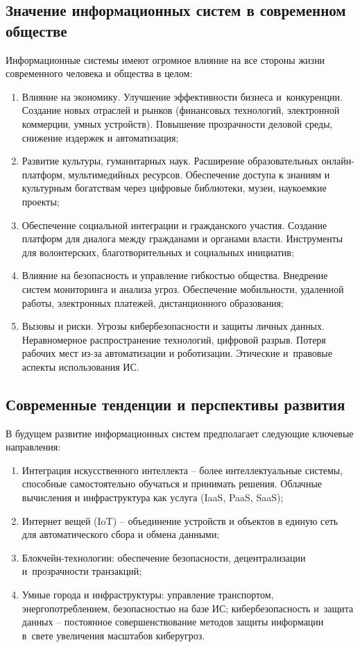 \documentclass{ou}
\begin{document}
\subsection{Значение информационных систем в современном обществе}
Информационные системы имеют огромное влияние на все стороны жизни современного человека и общества в целом:
\begin{enumerate}[leftmargin=0em, itemindent=3.75em, nosep, label=\arabic*)]
\item Влияние на экономику. Улучшение эффективности бизнеса и~конкуренции. Создание новых отраслей и рынков (финансовых технологий, электронной коммерции, умных устройств). Повышение прозрачности деловой среды, снижение издержек и автоматизация;
\item Развитие культуры, гуманитарных наук. Расширение образовательных онлайн-платформ, мультимедийных ресурсов. Обеспечение доступа к знаниям и культурным богатствам через цифровые библиотеки, музеи, наукоемкие проекты;
\item Обеспечение социальной интеграции и гражданского участия. Создание платформ для диалога между гражданами и органами власти. Инструменты для волонтерских, благотворительных и социальных инициатив;
\item Влияние на безопасность и управление гибкостью общества. Внедрение систем мониторинга и анализа угроз. Обеспечение мобильности, удаленной работы, электронных платежей, дистанционного образования;
\item Вызовы и риски. Угрозы кибербезопасности и защиты личных данных. Неравномерное распространение технологий, цифровой разрыв. Потеря рабочих мест из-за автоматизации и роботизации. Этические и~правовые аспекты использования ИС.
\end{enumerate}
\subsection{Современные тенденции и перспективы развития}
В будущем развитие информационных систем предполагает следующие ключевые направления:
\begin{enumerate}[leftmargin=0em, itemindent=3.75em, nosep, label=\arabic*)]
\item Интеграция искусственного интеллекта -- более интеллектуальные системы, способные самостоятельно обучаться и принимать решения. Облачные вычисления и инфраструктура как услуга (IaaS, PaaS, SaaS);
\item Интернет вещей (IoT) -- объединение устройств и объектов в единую сеть для автоматического сбора и обмена данными;
\item Блокчейн-технологии: обеспечение безопасности, децентрализации и~прозрачности транзакций;
\item Умные города и инфраструктуры: управление транспортом, энергопотреблением, безопасностью на базе ИС;
кибербезопасность и~защита данных -- постоянное совершенствование методов защиты информации в~свете увеличения масштабов киберугроз.
\end{enumerate}
\end{document}
